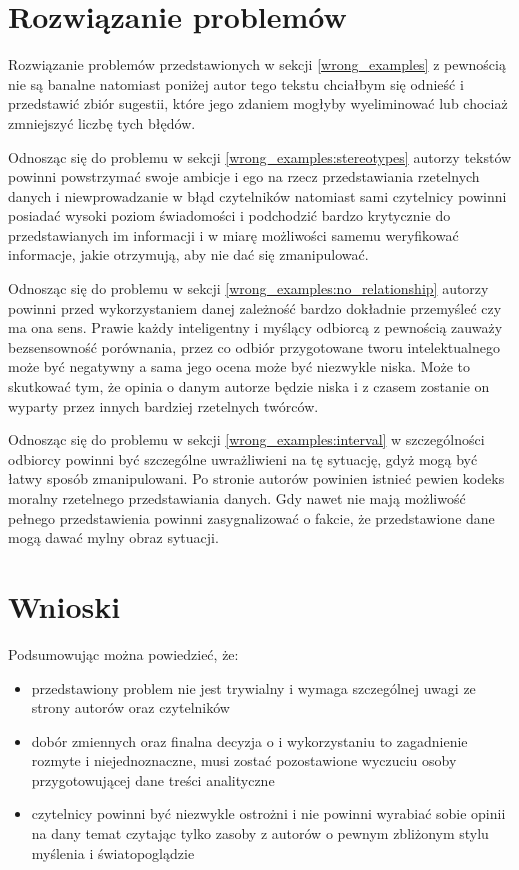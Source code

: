 \documentclass{classrep}
\begin{document}
    \section{Rozwiązanie problemów}
    \label{good_examples}{
        Rozwiązanie problemów przedstawionych w sekcji \ref{wrong_examples} z pewnością
        nie są banalne natomiast poniżej autor tego tekstu chciałbym się
        odnieść i przedstawić zbiór sugestii, które jego zdaniem mogłyby wyeliminować
        lub chociaż zmniejszyć liczbę tych błędów.

        Odnosząc się do problemu w sekcji \ref{wrong_examples:stereotypes} autorzy
        tekstów powinni powstrzymać swoje ambicje i ego na rzecz przedstawiania
        rzetelnych danych i niewprowadzanie w błąd czytelników natomiast sami
        czytelnicy powinni posiadać wysoki poziom świadomości i podchodzić bardzo
        krytycznie do przedstawianych im informacji i w miarę możliwości samemu
        weryfikować informacje, jakie otrzymują, aby nie dać się zmanipulować.

        Odnosząc się do problemu w sekcji \ref{wrong_examples:no_relationship} autorzy
        powinni przed wykorzystaniem danej zależność bardzo dokładnie przemyśleć czy ma
        ona sens. Prawie każdy inteligentny i myślący odbiorcą z pewnością zauważy
        bezsensowność porównania, przez co odbiór przygotowane tworu intelektualnego może
        być negatywny a sama jego ocena może być niezwykle niska. Może to skutkować
        tym, że opinia o danym autorze będzie niska i z czasem zostanie on wyparty
        przez innych bardziej rzetelnych twórców.

        Odnosząc się do problemu w sekcji \ref{wrong_examples:interval} w szczególności
        odbiorcy powinni być szczególne uwrażliwieni na tę sytuację, gdyż mogą być łatwy
        sposób zmanipulowani. Po stronie autorów powinien istnieć pewien kodeks moralny
        rzetelnego przedstawiania danych. Gdy nawet nie mają możliwość pełnego
        przedstawienia powinni zasygnalizować o fakcie, że przedstawione dane mogą dawać
        mylny obraz sytuacji.
    }

    \section{Wnioski} {
        Podsumowując można powiedzieć, że:
        \begin{itemize}
            \item przedstawiony problem nie jest trywialny i wymaga szczególnej uwagi
            ze strony autorów oraz czytelników
            \item dobór zmiennych oraz finalna decyzja o i wykorzystaniu to zagadnienie
            rozmyte i niejednoznaczne, musi zostać pozostawione wyczuciu osoby
            przygotowującej dane treści analityczne
            \item czytelnicy powinni być niezwykle ostrożni i nie powinni wyrabiać
            sobie opinii na dany temat czytając tylko zasoby z autorów o pewnym
            zbliżonym stylu myślenia i światopoglądzie
        \end{itemize}
    }
\end{document}
